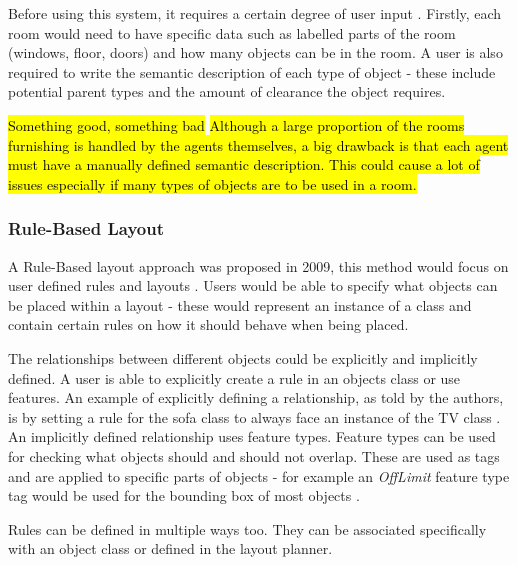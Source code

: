 Before using this system, it requires a certain degree of user input \cite{real-time-walkthroughs}. Firstly, each room would need to have specific data such as labelled parts of the room (windows, floor, doors) and how many objects can be in the room.
A user is also required to write the semantic description of each type of object - these include potential parent types and the amount of clearance the object requires.

\hl{Something good, something bad}
\hl{Although a large proportion of the rooms furnishing is handled by the agents themselves, a big drawback is that each agent must have a manually defined semantic description. This could cause a lot of issues especially if many types of objects are to be used in a room.}

\subsubsection*{Rule-Based Layout}
A Rule-Based layout approach was proposed in 2009, this method would focus on user defined rules and layouts \cite{rule-based-layout}. Users would be able to specify what objects can be placed within a layout - these would represent an instance of a class and contain certain rules on how it should behave when being placed.

The relationships between different objects could be explicitly and implicitly defined. A user is able to explicitly create a rule in an objects class or use features. An example of explicitly defining a relationship, as told by the authors, is by setting a rule for the sofa class to always face an instance of the TV class \cite{rule-based-layout}.
An implicitly defined relationship uses feature types. Feature types can be used for checking what objects should and should not overlap. These are used as tags and are applied to specific parts of objects - for example an \textit{OffLimit} feature type tag would be used for the bounding box of most objects \cite{rule-based-layout}.

Rules can be defined in multiple ways too. They can be associated specifically with an object class or defined in the layout planner.%

